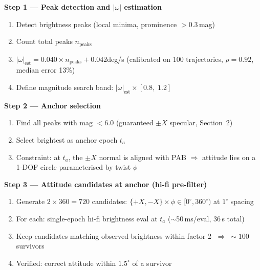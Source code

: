 \documentclass[11pt,a4paper]{article}
\begin{document}
\noindent\textbf{Step 1 --- Peak detection and $|\omega|$ estimation}
\begin{enumerate}[nosep,label=\alph*.]
  \item Detect brightness peaks (local minima, prominence $> 0.3$\,mag)
  \item Count total peaks $n_\text{peaks}$
  \item $|\omega|_\text{est} = 0.040 \times n_\text{peaks} + 0.042$\;deg/s
    \quad(calibrated on 100 trajectories, $\rho = 0.92$, median error 13\%)
  \item Define magnitude search band: $|\omega|_\text{est} \times [0.8,\; 1.2]$
\end{enumerate}

\vspace{0.5em}
\noindent\textbf{Step 2 --- Anchor selection}
\begin{enumerate}[nosep,label=\alph*.]
  \item Find all peaks with mag $< 6.0$ (guaranteed $\pm X$ specular, Section~2)
  \item Select brightest as anchor epoch $t_a$
  \item Constraint: at $t_a$, the $\pm X$ normal is aligned with PAB
    $\Rightarrow$ attitude lies on a 1-DOF circle parameterised by twist $\phi$
\end{enumerate}

\vspace{0.5em}
\noindent\textbf{Step 3 --- Attitude candidates at anchor (hi-fi pre-filter)}
\begin{enumerate}[nosep,label=\alph*.]
  \item Generate $2 \times 360 = 720$ candidates: $\{+X, -X\} \times \phi \in [0^\circ, 360^\circ)$ at $1^\circ$ spacing
  \item For each: single-epoch hi-fi brightness eval at $t_a$ \quad($\sim$50\,ms/eval, 36\,s total)
  \item Keep candidates matching observed brightness within factor 2 $\;\Rightarrow\; {\sim}100$ survivors
  \item Verified: correct attitude within $1.5^\circ$ of a survivor
\end{enumerate}
\end{document}

